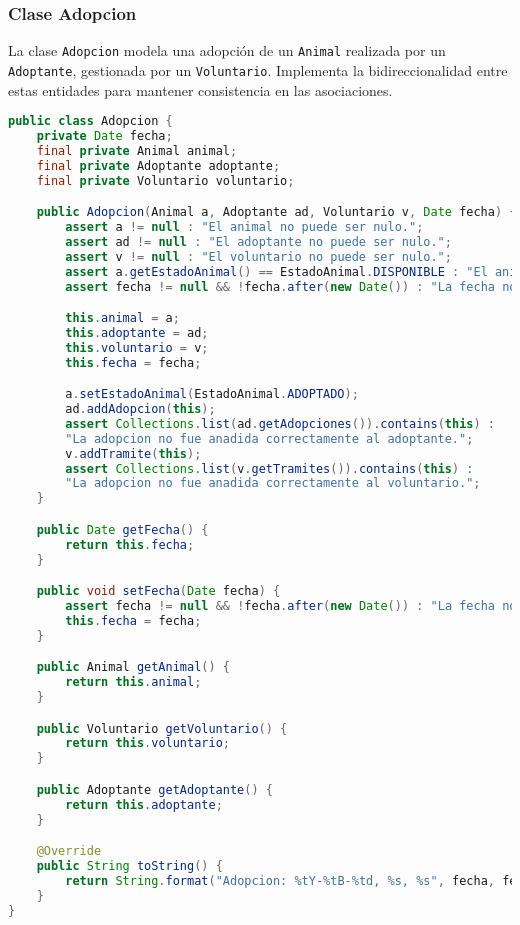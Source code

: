 \subsubsection{Clase Adopcion}
La clase \texttt{Adopcion} modela una adopción de un \texttt{Animal} realizada por un \texttt{Adoptante}, gestionada por un \texttt{Voluntario}. Implementa la bidireccionalidad entre estas entidades para mantener consistencia en las asociaciones.

\begin{lstlisting}[language=Java]
public class Adopcion {
    private Date fecha;
    final private Animal animal;
    final private Adoptante adoptante;
    final private Voluntario voluntario;

    public Adopcion(Animal a, Adoptante ad, Voluntario v, Date fecha) {
        assert a != null : "El animal no puede ser nulo.";
        assert ad != null : "El adoptante no puede ser nulo.";
        assert v != null : "El voluntario no puede ser nulo.";
        assert a.getEstadoAnimal() == EstadoAnimal.DISPONIBLE : "El animal debe estar disponible para adopcion.";
        assert fecha != null && !fecha.after(new Date()) : "La fecha no puede ser nula ni estar en el futuro.";

        this.animal = a;
        this.adoptante = ad;
        this.voluntario = v;
        this.fecha = fecha;

        a.setEstadoAnimal(EstadoAnimal.ADOPTADO);
        ad.addAdopcion(this);
        assert Collections.list(ad.getAdopciones()).contains(this) : 
        "La adopcion no fue anadida correctamente al adoptante.";
        v.addTramite(this);
        assert Collections.list(v.getTramites()).contains(this) : 
        "La adopcion no fue anadida correctamente al voluntario.";
    }

    public Date getFecha() {
        return this.fecha;
    }

    public void setFecha(Date fecha) {
        assert fecha != null && !fecha.after(new Date()) : "La fecha no puede ser nula ni estar en el futuro";
        this.fecha = fecha;
    }

    public Animal getAnimal() {
        return this.animal;
    }

    public Voluntario getVoluntario() {
        return this.voluntario;
    }

    public Adoptante getAdoptante() {
        return this.adoptante;
    }

    @Override
    public String toString() {
        return String.format("Adopcion: %tY-%tB-%td, %s, %s", fecha, fecha, fecha, animal, adoptante);
    }
}
\end{lstlisting}

